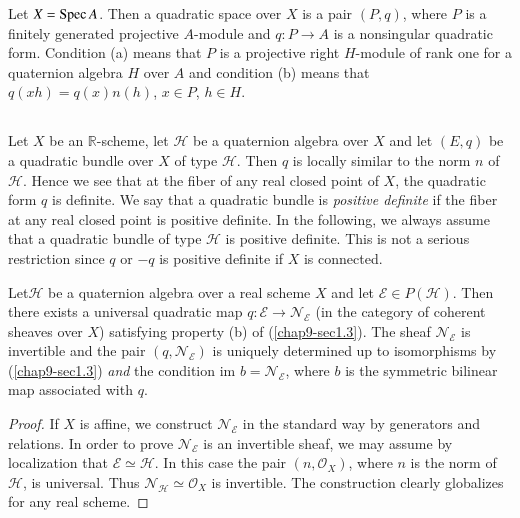 Let $X=\operatorname{Spec} A$. Then a quadratic space over $X$ is a pair $(P,q)$,
where $P$ is a finitely generated projective $A$-module and $q:P\to A$
is a nonsingular quadratic form. Condition (a) means that $P$ is a
projective right $H$-module of rank one for a quaternion algebra $H$
over $A$ and condition (b) means that $q(xh)=q(x)n(h)$, $x\in P$,
$h\in H$.

\subsection{}\label{chap9-sec1.4}

Let $X$ be an $\mathbb{R}$-scheme, let $\mathscr{H}$ be a quaternion
algebra over $X$ and let $(E,q)$ be a quadratic bundle over $X$ of
type $\mathscr{H}$. Then $q$ is locally similar to the norm $n$ of
$\mathscr{H}$. Hence we see that at the fiber of any real closed point
of $X$, the quadratic form $q$ is definite. We say that a quadratic
bundle is {\em positive definite} if the fiber at any real closed
point is positive definite. In the following, we always assume that a
quadratic bundle of type $\mathscr{H}$ is positive definite. This is
not a serious restriction since $q$ or $-q$ is positive definite if
$X$ is connected.

\setcounter{subprop}{4}
\begin{subprop}\label{chap9-prop1.5}
Let\pageoriginale $\mathscr{H}$ be a quaternion algebra over a real
scheme $X$ and 
let $\mathscr{E}\in P(\mathscr{H})$. Then there exists a universal
quadratic map $q:\mathscr{E}\to \mathscr{N}_{\mathscr{E}}$ (in the
category of coherent sheaves over $X$) satisfying property (b) of
(\ref{chap9-sec1.3}). The sheaf $\mathscr{N}_{\mathscr{E}}$ is
invertible and the pair $(q,\mathscr{N}_{\mathscr{E}})$ is uniquely
determined up to isomorphisms by (\ref{chap9-sec1.3}) {\em and} the
condition im $b=\mathscr{N}_{\mathscr{E}}$, where $b$ is the symmetric
bilinear map associated with $q$. 
\end{subprop}

\begin{proof}
If $X$ is affine, we construct $\mathscr{N}_{\mathscr{E}}$ in the
standard way by generators and relations. In order to prove
$\mathscr{N}_{\mathscr{E}}$ is an invertible sheaf, we may assume by
localization that $\mathscr{E}\simeq \mathscr{H}$. In this case the
pair $(n,\mathscr{O}_{X})$, where $n$ is the norm of $\mathscr{H}$, is
universal. Thus $\mathscr{N}_{\mathscr{H}}\simeq \mathscr{O}_{X}$ is
invertible. The construction clearly globalizes for any real scheme.
\end{proof}

